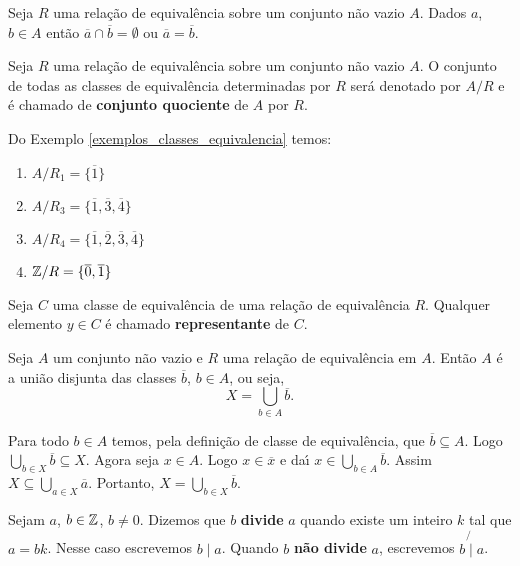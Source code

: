 \begin{corolario}
	Seja $R$ uma relação de equivalência sobre um conjunto não vazio $A$. Dados $a$, $b \in A$ então $\overline{a} \cap \overline{b} = \emptyset$ ou $\overline{a} = \overline{b}$.
\end{corolario}

\begin{definicao}
	Seja $R$ uma relação de equivalência sobre um conjunto não vazio $A$. O conjunto de todas as classes de equival{\^e}ncia determinadas por $R$ ser{\'a} denotado por $A/R$ e {\'e} chamado de \textbf{conjunto quociente} de $A$ por $R$.
\end{definicao}

\begin{exemplos}
	Do Exemplo \ref{exemplos_classes_equivalencia} temos:
	\begin{enumerate}[label={\arabic*})]
		\item $A/R_1 = \{\overline{1}\}$
		\item $A/R_3 = \{\overline{1},\overline{3},\overline{4}\}$
		\item $A/R_4 = \{\overline{1},\overline{2},\overline{3},\overline{4}\}$
		\item $\mathbb{Z}/R = \{\overline{0},\overline{1}\}$
	\end{enumerate}
\end{exemplos}

\begin{definicao}
	Seja $C$ uma classe de equival{\^e}ncia de uma rela{\c c}{\~a}o de equival{\^e}ncia $R$. Qualquer elemento $y\in C$ {\'e} chamado \textbf{representante} de $C$.
\end{definicao}

\begin{proposicao}
	Seja $A$ um conjunto n{\~a}o vazio e $R$ uma rela{\c c}{\~a}o de equival{\^e}ncia em $A$. Ent{\~a}o $A$ {\'e} a uni{\~a}o disjunta das classes $\overline{b}$, $b \in A$, ou seja,
	\[
		X = \bigcup_{b\in A}\overline{b}.
	\]
\end{proposicao}
\begin{prova}
	Para todo $b\in A$ temos, pela definição de classe de equivalência, que $\overline{b}\subseteq A$. Logo $\bigcup_{b\in X}\overline{b}\subseteq X$. Agora seja $x\in A$. Logo $x \in \overline{x}$ e da{\'\i} $x\in \bigcup_{b\in A}\overline{b}$. Assim $X\subseteq\bigcup_{a\in X}\overline{a}$. Portanto, $X=\bigcup_{b\in X}\overline{b}$.
\end{prova}

\begin{definicao}
	Sejam $a$, $b \in \mathbb{Z}$, $b \neq 0$. Dizemos que $b$ \textbf{divide} $a$ quando existe um inteiro $k$ tal que $a=bk$.
	Nesse caso escrevemos $b \mid a$. Quando $b$ \textbf{n{\~a}o divide} $a$, escrevemos $b\not{\mid}a$.
\end{definicao}

